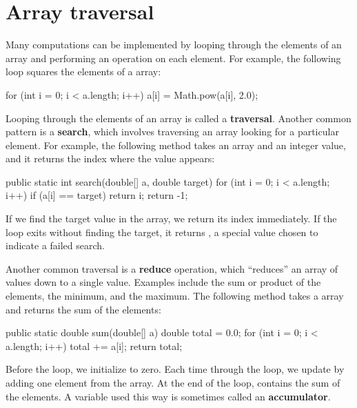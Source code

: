 \section{Array traversal}
\label{traversal}

Many computations can be implemented by looping through the elements of an array and performing an operation on each element.
For example, the following loop squares the elements of a  array:

\begin{code}
for (int i = 0; i < a.length; i++) {
    a[i] = Math.pow(a[i], 2.0);
}
\end{code}


Looping through the elements of an array is called a {\bf traversal}.
Another common pattern is a {\bf search}, which involves traversing an array looking for a particular element.
For example, the following method takes an  array and an integer value, and it returns the index where the value appears:

\begin{code}
public static int search(double[] a, double target) {
    for (int i = 0; i < a.length; i++) {
        if (a[i] == target) {
            return i;
        }
    }
    return -1;
}
\end{code}

If we find the target value in the array, we return its index immediately.
If the loop exits without finding the target, it returns , a special value chosen to indicate a failed search.


Another common traversal is a {\bf reduce} operation, which ``reduces'' an array of values down to a single value.
Examples include the sum or product of the elements, the minimum, and the maximum.
The following method takes a  array and returns the sum of the elements:

\begin{code}
public static double sum(double[] a) {
    double total = 0.0;
    for (int i = 0; i < a.length; i++) {
        total += a[i];
    }
    return total;
}
\end{code}


Before the loop, we initialize  to zero.
Each time through the loop, we update  by adding one element from the array.
At the end of the loop,  contains the sum of the elements.
A variable used this way is sometimes called an {\bf accumulator}.


